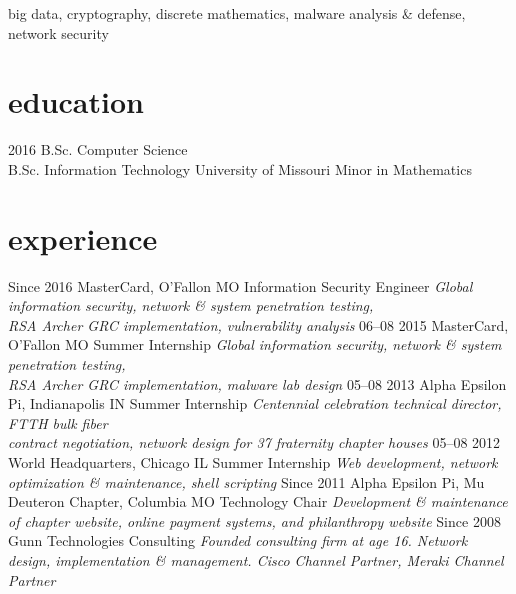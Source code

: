 \documentclass[print]{gunn-resume}
\begin{document}
big data, cryptography, discrete mathematics, malware analysis \& defense, network security
\section{education}

\begin{entrylist}
  \entry
    {2016}
    {B.Sc. {\normalfont Computer Science}\\
    B.Sc. {\normalfont Information Technology}}
    {University of Missouri}
    {Minor in Mathematics}
\end{entrylist}

\section{experience}

\begin{entrylist}
\entry
    {Since 2016}
    {MasterCard, O'Fallon MO}
    {Information Security Engineer}
    {\emph{Global information security, network \& system penetration testing,\\RSA Archer GRC implementation, vulnerability analysis}}
 \entry
    {06–08 2015}
    {MasterCard, O'Fallon MO}
    {Summer Internship}
    {\emph{Global information security, network \& system penetration testing,\\RSA Archer GRC implementation, malware lab design}}
  \entry
    {05–08 2013}
    {Alpha Epsilon Pi, Indianapolis IN}
    {Summer Internship}
    {\emph{Centennial celebration technical director, FTTH bulk fiber\\ contract negotiation, network design for 37 fraternity chapter houses}}
  \entry
    {05–08 2012}
    {World Headquarters, Chicago IL}
    {Summer Internship}
    {\emph{Web development, network optimization \& maintenance, shell scripting}}
      \entry
    {Since 2011}
    {Alpha Epsilon Pi, Mu Deuteron Chapter, Columbia MO}
    {Technology Chair}
    {\emph{Development \& maintenance of chapter website, online payment systems, and philanthropy website}}
  \entry
    {Since 2008}
    {Gunn Technologies}
    {Consulting}
    {\emph{Founded consulting firm at age 16. Network design, implementation \& management. Cisco Channel Partner, Meraki Channel Partner}}
\end{entrylist}
\end{document}

